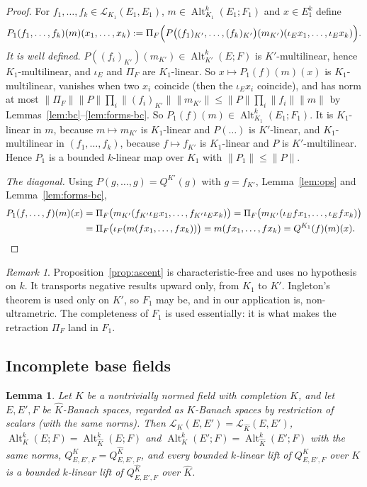\documentclass[11pt]{amsart}
\newtheorem{lemma}[theorem]{Lemma}
\theoremstyle{definition}
\theoremstyle{remark}
\newtheorem{remark}[theorem]{Remark}
\numberwithin{equation}{section}
\newcommand{\cL}{\mathcal{L}}
\newcommand{\Alt}{\operatorname{Alt}}
\newcommand{\Kh}{\widehat K}
\newcommand{\norm}[1]{\lVert #1\rVert}
\begin{document}
\begin{proof}
For $f_1,\dots,f_k\in\cL_{K_1}(E_1,E_1)$, $m\in\Alt^k_{K_1}(E_1;F_1)$ and $x\in E_1^k$ define
\[
P_1(f_1,\dots,f_k)(m)(x_1,\dots,x_k):=\Pi_F\Bigl(P\bigl((f_1)_{K'},\dots,(f_k)_{K'}\bigr)(m_{K'})(\iota_Ex_1,\dots,\iota_Ex_k)\Bigr).
\]
\emph{It is well defined.} $P((f_i)_{K'})(m_{K'})\in\Alt^k_{K'}(E;F)$ is $K'$\nobreakdash-multilinear, hence $K_1$\nobreakdash-multilinear, and
$\iota_E$ and $\Pi_F$ are $K_1$\nobreakdash-linear. So $x\mapsto P_1(f)(m)(x)$ is $K_1$\nobreakdash-multilinear, vanishes when two $x_i$ coincide
(then the $\iota_Ex_i$ coincide), and has norm at most
$\norm{\Pi_F}\norm P\prod_i\norm{(f_i)_{K'}}\norm{m_{K'}}\le\norm P\prod_i\norm{f_i}\norm m$ by
Lemmas~\ref{lem:bc}--\ref{lem:forms-bc}. So $P_1(f)(m)\in\Alt^k_{K_1}(E_1;F_1)$. It is $K_1$\nobreakdash-linear in $m$, because
$m\mapsto m_{K'}$ is $K_1$\nobreakdash-linear and $P(\dots)$ is $K'$\nobreakdash-linear, and $K_1$\nobreakdash-multilinear in $(f_1,\dots,f_k)$, because
$f\mapsto f_{K'}$ is $K_1$\nobreakdash-linear and $P$ is $K'$\nobreakdash-multilinear. Hence $P_1$ is a bounded $k$\nobreakdash-linear map over $K_1$ with
$\norm{P_1}\le\norm P$.

\emph{The diagonal.} Using $P(g,\dots,g)=Q^{K'}(g)$ with $g=f_{K'}$, Lemma~\ref{lem:ops} and Lemma~\ref{lem:forms-bc},
\begin{align*}
P_1(f,\dots,f)(m)(x)&=\Pi_F\bigl(m_{K'}(f_{K'}\iota_Ex_1,\dots,f_{K'}\iota_Ex_k)\bigr)
=\Pi_F\bigl(m_{K'}(\iota_Efx_1,\dots,\iota_Efx_k)\bigr)\\
&=\Pi_F\bigl(\iota_F(m(fx_1,\dots,fx_k))\bigr)=m(fx_1,\dots,fx_k)=Q^{K_1}(f)(m)(x).\qedhere
\end{align*}
\end{proof}

\begin{remark}\label{rem:ascent}
Proposition~\ref{prop:ascent} is characteristic-free and uses no hypothesis on $k$. It transports negative results
upward only, from $K_1$ to $K'$. Ingleton's theorem is used only on $K'$, so $F_1$ may be, and in our application is,
non-ultrametric. The completeness of $F_1$ is used essentially: it is what makes the retraction $\Pi_F$ land in $F_1$.
\end{remark}

\subsection{Incomplete base fields}

\begin{lemma}\label{lem:descent}
Let $K$ be a nontrivially normed field with completion $\Kh$, and let $E,E',F$ be $\Kh$\nobreakdash-Banach spaces, regarded as
$K$\nobreakdash-Banach spaces by restriction of scalars (with the same norms). Then $\cL_K(E,E')=\cL_{\Kh}(E,E')$,
$\Alt^k_K(E;F)=\Alt^k_{\Kh}(E;F)$ and $\Alt^k_K(E';F)=\Alt^k_{\Kh}(E';F)$ with the same norms, $Q^K_{E,E',F}=Q^{\Kh}_{E,E',F}$,
and every bounded $k$\nobreakdash-linear lift of $Q^K_{E,E',F}$ over $K$ is a bounded $k$\nobreakdash-linear lift of $Q^{\Kh}_{E,E',F}$ over
$\Kh$.
\end{lemma}
\end{document}
